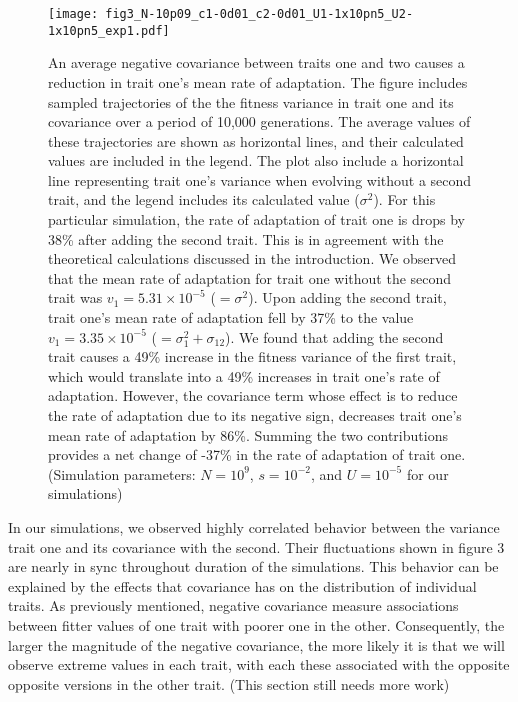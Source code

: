 \documentclass[11pt,twocolumn]{article}
\begin{document}
\begin{figure}
\texttt{[image: fig3\_N-10p09\_c1-0d01\_c2-0d01\_U1-1x10pn5\_U2-1x10pn5\_exp1.pdf]}
\label{Figure}
\caption{\footnotesize An average negative covariance between traits one and two causes a reduction in trait one's mean rate of adaptation. The figure includes sampled trajectories of the the fitness variance in trait one and its covariance over a period of 10,000 generations.  The average values of these trajectories are shown as horizontal lines, and their calculated values are included in the legend. The plot also include a horizontal line representing trait one's variance when evolving without a second trait, and the legend includes its calculated value ($\sigma^2$).  For this particular simulation, the rate of adaptation of trait one is drops by 38\% after adding the second trait. This is in agreement with the theoretical calculations  discussed in the introduction. We observed that the mean rate of adaptation for trait one without the second trait was $v_1 = 5.31 \times 10^{-5}$ ($= \sigma^2 $). Upon adding the second trait, trait one's mean rate of adaptation fell by 37\% to the value $v_1  = 3.35 \times 10^{-5}$ ($= \sigma_1^2+\sigma_{12}$). We found that adding the second trait causes a 49\% increase in the fitness variance of the first trait, which would translate into a 49\% increases in trait one's rate of adaptation. However, the covariance term whose effect is to reduce the rate of adaptation due to its negative sign, decreases trait one's mean rate of adaptation by 86\%. Summing the two contributions provides a net change of -37\% in the rate of adaptation of trait one. (Simulation parameters: $N=10^9$, $s=10^{-2}$, and $U=10^{-5}$ for our simulations)}
\end{figure}

In our simulations, we observed highly correlated behavior between the variance trait one and its covariance with the second.  Their fluctuations shown in figure 3 are nearly in sync throughout duration of the simulations. This behavior can be explained by the effects that covariance has on the distribution of individual traits.  As previously mentioned, negative covariance measure associations between fitter values of one trait with poorer one in the other.  Consequently, the larger the magnitude of the negative covariance, the more likely it is that we will observe extreme values in each trait, with each these associated with the opposite opposite versions in the other trait.   (This section still needs more work)\par
\end{document}
